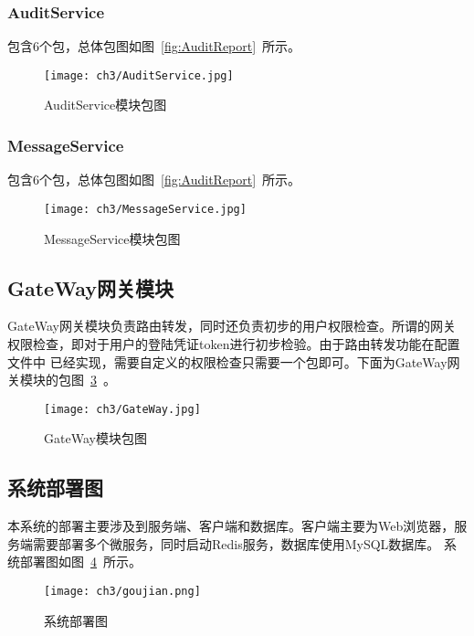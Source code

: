\subsubsection{AuditService}
包含6个包，总体包图如图~\ref{fig:AuditReport}~所示。
\begin{figure}[htbp]
    \centering
    \texttt{[image: ch3/AuditService.jpg]}
    \caption{AuditService模块包图}\label{fig:AuditService}
    \vspace{\baselineskip} %
\end{figure}

\subsubsection{MessageService}
包含6个包，总体包图如图~\ref{fig:AuditReport}~所示。
\begin{figure}[htbp]
    \centering
    \texttt{[image: ch3/MessageService.jpg]}
    \caption{MessageService模块包图}\label{fig:MessageService}
    \vspace{\baselineskip} %
\end{figure}


\subsection{GateWay网关模块}
GateWay网关模块负责路由转发，同时还负责初步的用户权限检查。所谓的网关权限检查，即对于用户的登陆凭证token进行初步检验。由于路由转发功能在配置文件中
已经实现，需要自定义的权限检查只需要一个包即可。下面为GateWay网关模块的包图~\ref{fig:GateWay}~。
\begin{figure}[htbp]
    \centering
    \texttt{[image: ch3/GateWay.jpg]}
    \caption{GateWay模块包图}\label{fig:GateWay}
    \vspace{\baselineskip} %
\end{figure}

\subsection{系统部署图}
本系统的部署主要涉及到服务端、客户端和数据库。客户端主要为Web浏览器，服务端需要部署多个微服务，同时启动Redis服务，数据库使用MySQL数据库。
系统部署图如图~\ref{fig:goujian}~所示。
\begin{figure}[htbp]
    \centering
    \texttt{[image: ch3/goujian.png]}
    \caption{系统部署图}\label{fig:goujian}
    \vspace{\baselineskip} %
\end{figure}